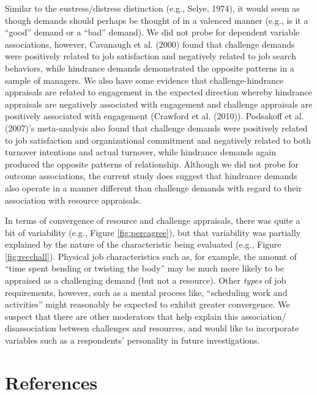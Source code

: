 \documentclass[
  man]{apa6}
\begin{document}
Similar to the eustress/distress distinction (e.g., Selye, 1974), it would seem as though demands should perhaps be thought of in a valenced manner (e.g., is it a ``good'' demand or a ``bad'' demand). We did not probe for dependent variable associations, however, Cavanaugh et al. (2000) found that challenge demands were positively related to job satisfaction and negatively related to job search behaviors, while hindrance demands demonstrated the opposite patterns in a sample of managers. We also have some evidence that challenge-hindrance appraisals are related to engagement in the expected direction whereby hindrance appraisals are negatively associated with engagement and challenge appraisals are positively associated with engagement (Crawford et al. (2010)). Podsakoff et al. (2007)'s meta-analysis also found that challenge demands were positively related to job satisfaction and organizational commitment and negatively related to both turnover intentions and actual turnover, while hindrance demands again produced the opposite patterns of relationship. Although we did not probe for outcome associations, the current study does suggest that hindrance demands also operate in a manner different than challenge demands with regard to their association with resource appraisals.

In terms of convergence of resource and challenge appraisals, there was quite a bit of variability (e.g., Figure \ref{fig:percagree}), but that variability was partially explained by the nature of the characteristic being evaluated (e.g., Figure \ref{fig:recchall}). Physical job characteristics such as, for example, the amount of ``time spent bending or twisting the body'' may be much more likely to be appraised as a challenging demand (but not a resource). Other \emph{types} of job requirements, however, such as a mental process like, ``scheduling work and activities'' might reasonably be expected to exhibit greater convergence. We suspect that there are other moderators that help explain this association/ disassociation between challenges and resources, and would like to incorporate variables such as a respondents' personality in future investigations.

\hypertarget{references}{%
\section*{References}\label{references}}
\end{document}
